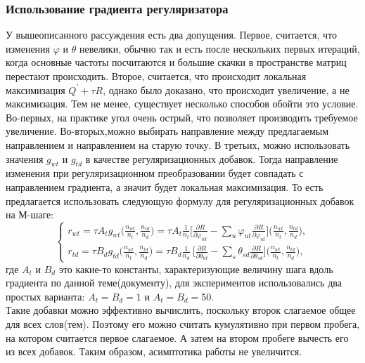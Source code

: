 \documentclass[12pt]{article}
\renewcommand{\phi}{\varphi}
\begin{document}
\subsubsection{Использование градиента регуляризатора}
\label{subsec:gradientuse}
У вышеописанного рассуждения есть два допущения. Первое, считается, что изменения $\phi$ и $\theta$ невелики, обычно так и есть после нескольких первых итераций, когда основные частоты посчитаются и большие скачки в пространстве матриц перестают происходить. Второе, считается, что происходит локальная максимизация $Q^{\prime} + \tau R$, однако было доказано, что происходит увеличение, а не максимизация. Тем не менее, существует несколько способов обойти это условие. Во-первых, на практике угол очень острый, что позволяет производить требуемое увеличение. Во-вторых,можно выбирать направление между предлагаемым направлением и направлением на старую точку. В третьих, можно использовать значения $g_{wt}$ и $g_{td}$ в качестве регуляризационных добавок. Тогда направление изменения при регуляризационном преобразовании будет совпадать с направлением градиента, а значит будет локальная максимизация. То есть предлагается использовать следующую формулу для регуляризационных добавок на М-шаге:
\[
\left\{
	\begin{aligned}
		r_{wt} = \tau A_t g_{wt}\bigg(\frac{n_{wt}}{n_t}, \frac{n_{td}}{n_d}\bigg) = \tau A_t \frac{1}{n_t} \bigg[{\frac{\partial{R}}{\partial{\phi_{wt}}} - \sum\limits_u \phi_{ut} \frac{\partial{R}}{\partial{\phi_{ut}}} }\bigg] \bigg(\frac{n_{wt}}{n_t}, \frac{n_{td}}{n_d}\bigg),\\
		r_{td} = \tau B_d g_{td} \bigg(\frac{n_{wt}}{n_t}, \frac{n_{td}}{n_d}\bigg) = \tau B_d \frac{1}{n_d} \ \bigg[ {\frac{\partial{R}}{\partial{\theta_{td}}} - \sum\limits_s \theta_{sd} \frac{\partial{R}}{\partial{\theta_{sd}}} }\bigg] \bigg(\frac{n_{wt}}{n_t}, \frac{n_{td}}{n_d}\bigg) ,
	\end{aligned}
\right.
\]
где $A_t$ и $B_d$ это какие-то константы, характеризующие величину шага вдоль градиента по данной теме(документу), для экспериментов использовались два простых варианта: $A_t = B_d = 1$ и $A_t=B_d=50$.\\
Такие добавки можно эффективно вычислить, поскольку второк слагаемое общее для всех слов(тем). Поэтому его можно считать кумулятивно при первом пробега, на котором считается первое слагаемое. А затем на втором пробеге вычесть его из всех добавок. Таким образом, асимптотика работы не увеличится. 
\end{document}
